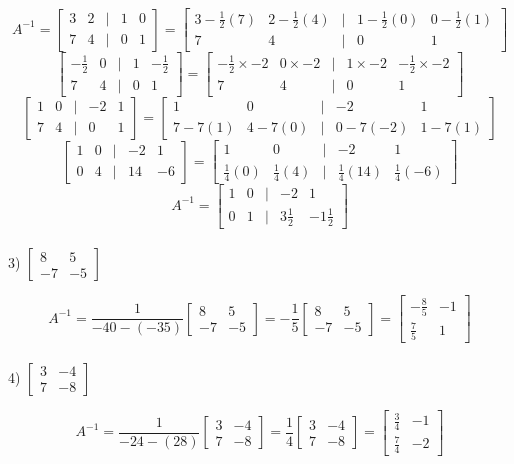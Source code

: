 \documentclass[a4paper]{article}
\begin{document}
\[A^{-1} =
\begin{bmatrix}
3&2&|&1&0\\
7&4&|&0&1
\end{bmatrix} =
\begin{bmatrix}
3-\frac{1}{2}(7)&2-\frac{1}{2}(4)&|&1-\frac{1}{2}(0)&0-\frac{1}{2}(1)\\
7&4&|&0&1
\end{bmatrix}
\]
\[
\begin{bmatrix}
-\frac{1}{2}&0&|&1&-\frac{1}{2}\\
7&4&|&0&1
\end{bmatrix} =
\begin{bmatrix}
-\frac{1}{2}\times-2&0\times-2&|&1\times-2&-\frac{1}{2}\times-2\\
7&4&|&0&1
\end{bmatrix}
\]
\[
\begin{bmatrix}
1&0&|&-2&1\\
7&4&|&0&1
\end{bmatrix} =
\begin{bmatrix}
1&0&|&-2&1\\
7-7(1)&4-7(0)&|&0-7(-2)&1-7(1)
\end{bmatrix}
\]
\[
\begin{bmatrix}
1&0&|&-2&1\\
0&4&|&14&-6
\end{bmatrix}=
\begin{bmatrix}
1&0&|&-2&1\\
\frac{1}{4}(0)&\frac{1}{4}(4)&|&\frac{1}{4}(14)&\frac{1}{4}(-6)
\end{bmatrix}
\]
\[A^{-1} =
\begin{bmatrix}
1&0&|&-2&1\\
0&1&|&3\frac{1}{2}&-1\frac{1}{2}
\end{bmatrix}
\]\\

3) $\begin{bmatrix}
8&5\\
-7&-5
\end{bmatrix}
$

\[A^{-1} =
\frac{1}{-40-(-35)}
\begin{bmatrix}
8&5\\
-7&-5
\end{bmatrix} =
-\frac{1}{5}
\begin{bmatrix}
8&5\\
-7&-5
\end{bmatrix} =
\begin{bmatrix}
-\frac{8}{5}&-1\\
\frac{7}{5}&1
\end{bmatrix}
\]\\

4) $\begin{bmatrix}
3&-4\\
7&-8
\end{bmatrix}$

\[A^{-1} =
\frac{1}{-24-(28)}
\begin{bmatrix}
3&-4\\
7&-8
\end{bmatrix} =
\frac{1}{4}
\begin{bmatrix}
3&-4\\
7&-8
\end{bmatrix} =
\begin{bmatrix}
\frac{3}{4}&-1\\
\frac{7}{4}&-2
\end{bmatrix}
\]
\end{document}
